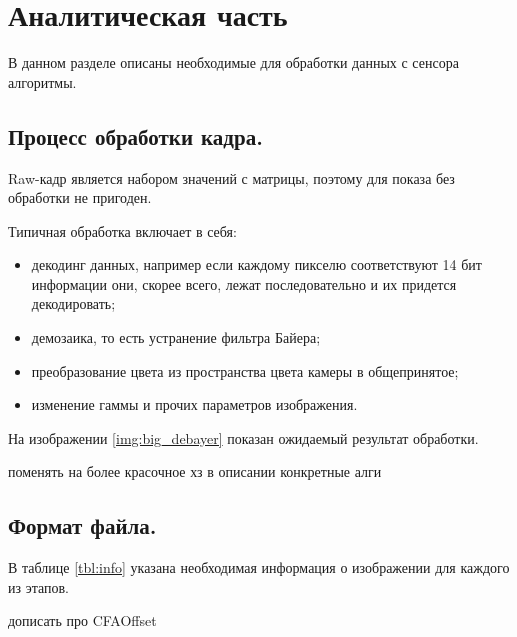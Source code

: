 \chapter{Аналитическая часть}

В данном разделе описаны необходимые для обработки данных с сенсора алгоритмы.

\section{Процесс обработки кадра.}

Raw-кадр является набором значений с матрицы, поэтому для показа без обработки не пригоден.

Типичная обработка включает в себя:
\begin{itemize}
	\item декодинг данных, например если каждому пикселю соответствуют 14 бит информации они, скорее всего, лежат последовательно и их придется декодировать;
	\item демозаика, то есть устранение фильтра Байера;
	\item преобразование цвета из пространства цвета камеры в общепринятое;
	\item изменение гаммы и прочих параметров изображения.
\end{itemize}

На изображении \ref{img:big_debayer} показан ожидаемый результат обработки.


поменять на более красочное хз
в описании конкретные алги

\section{Формат файла.}

В таблице \ref{tbl:info} указана необходимая информация о изображении для каждого из этапов.

\begin{table}[h]
	\begin{center}
		\caption{Используемая информация о изображении.}
		\label{tbl:info}
	\end{center}
\end{table}
дописать про CFAOffset


